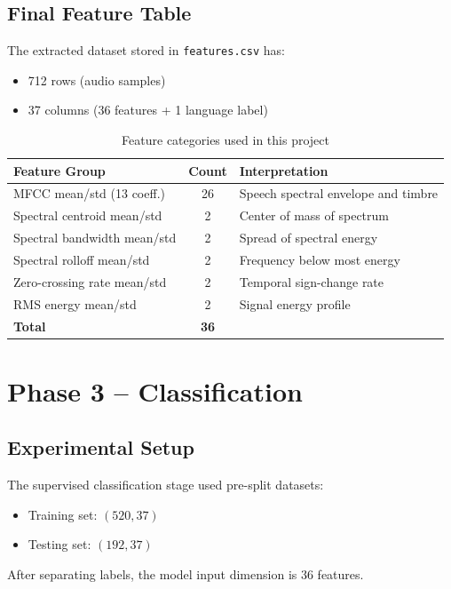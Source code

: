 \documentclass[a4paper,14pt]{extarticle}
\begin{document}
\subsection{Final Feature Table}
The extracted dataset stored in \texttt{features.csv} has:
\begin{itemize}
    \item 712 rows (audio samples)
    \item 37 columns (36 features + 1 language label)
\end{itemize}

\begin{table}[h]
    \centering
    \caption{Feature categories used in this project}
    \begin{tabular}{|l|c|l|}
        \hline
        Feature Group & Count & Interpretation \\
        \hline
        MFCC mean/std (13 coeff.) & 26 & Speech spectral envelope and timbre \\
        Spectral centroid mean/std & 2 & Center of mass of spectrum \\
        Spectral bandwidth mean/std & 2 & Spread of spectral energy \\
        Spectral rolloff mean/std & 2 & Frequency below most energy \\
        Zero-crossing rate mean/std & 2 & Temporal sign-change rate \\
        RMS energy mean/std & 2 & Signal energy profile \\
        \hline
        \textbf{Total} & \textbf{36} & \\
        \hline
    \end{tabular}
    \label{tab:feature_summary}
\end{table}

\newpage
\section{Phase 3 -- Classification}

\subsection{Experimental Setup}
The supervised classification stage used pre-split datasets:
\begin{itemize}
    \item Training set: \((520, 37)\)
    \item Testing set: \((192, 37)\)
\end{itemize}
After separating labels, the model input dimension is 36 features.
\end{document}
